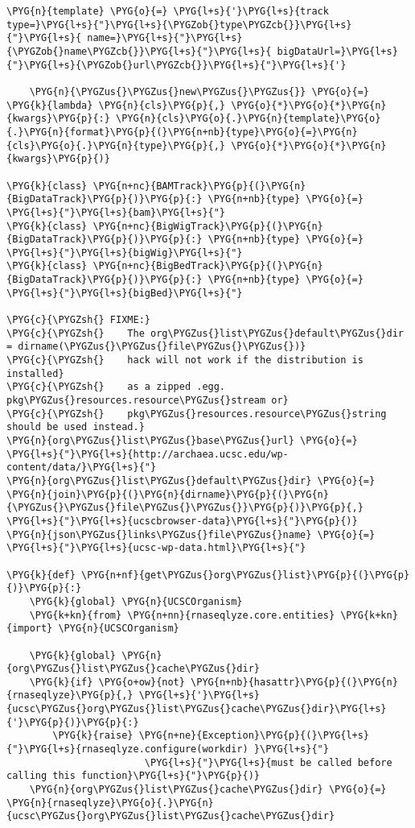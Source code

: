 \begin{Verbatim}[commandchars=\\\{\}]
    \PYG{n}{template} \PYG{o}{=} \PYG{l+s}{'}\PYG{l+s}{track type=}\PYG{l+s}{"}\PYG{l+s}{\PYGZob{}type\PYGZcb{}}\PYG{l+s}{"}\PYG{l+s}{ name=}\PYG{l+s}{"}\PYG{l+s}{\PYGZob{}name\PYGZcb{}}\PYG{l+s}{"}\PYG{l+s}{ bigDataUrl=}\PYG{l+s}{"}\PYG{l+s}{\PYGZob{}url\PYGZcb{}}\PYG{l+s}{"}\PYG{l+s}{'}

    \PYG{n}{\PYGZus{}\PYGZus{}new\PYGZus{}\PYGZus{}} \PYG{o}{=} \PYG{k}{lambda} \PYG{n}{cls}\PYG{p}{,} \PYG{o}{*}\PYG{o}{*}\PYG{n}{kwargs}\PYG{p}{:} \PYG{n}{cls}\PYG{o}{.}\PYG{n}{template}\PYG{o}{.}\PYG{n}{format}\PYG{p}{(}\PYG{n+nb}{type}\PYG{o}{=}\PYG{n}{cls}\PYG{o}{.}\PYG{n}{type}\PYG{p}{,} \PYG{o}{*}\PYG{o}{*}\PYG{n}{kwargs}\PYG{p}{)}

\PYG{k}{class} \PYG{n+nc}{BAMTrack}\PYG{p}{(}\PYG{n}{BigDataTrack}\PYG{p}{)}\PYG{p}{:} \PYG{n+nb}{type} \PYG{o}{=} \PYG{l+s}{"}\PYG{l+s}{bam}\PYG{l+s}{"}
\PYG{k}{class} \PYG{n+nc}{BigWigTrack}\PYG{p}{(}\PYG{n}{BigDataTrack}\PYG{p}{)}\PYG{p}{:} \PYG{n+nb}{type} \PYG{o}{=} \PYG{l+s}{"}\PYG{l+s}{bigWig}\PYG{l+s}{"}
\PYG{k}{class} \PYG{n+nc}{BigBedTrack}\PYG{p}{(}\PYG{n}{BigDataTrack}\PYG{p}{)}\PYG{p}{:} \PYG{n+nb}{type} \PYG{o}{=} \PYG{l+s}{"}\PYG{l+s}{bigBed}\PYG{l+s}{"}

\PYG{c}{\PYGZsh{} FIXME:}
\PYG{c}{\PYGZsh{}    The org\PYGZus{}list\PYGZus{}default\PYGZus{}dir = dirname(\PYGZus{}\PYGZus{}file\PYGZus{}\PYGZus{})}
\PYG{c}{\PYGZsh{}    hack will not work if the distribution is installed}
\PYG{c}{\PYGZsh{}    as a zipped .egg. pkg\PYGZus{}resources.resource\PYGZus{}stream or}
\PYG{c}{\PYGZsh{}    pkg\PYGZus{}resources.resource\PYGZus{}string should be used instead.}
\PYG{n}{org\PYGZus{}list\PYGZus{}base\PYGZus{}url} \PYG{o}{=} \PYG{l+s}{"}\PYG{l+s}{http://archaea.ucsc.edu/wp-content/data/}\PYG{l+s}{"}
\PYG{n}{org\PYGZus{}list\PYGZus{}default\PYGZus{}dir} \PYG{o}{=} \PYG{n}{join}\PYG{p}{(}\PYG{n}{dirname}\PYG{p}{(}\PYG{n}{\PYGZus{}\PYGZus{}file\PYGZus{}\PYGZus{}}\PYG{p}{)}\PYG{p}{,} \PYG{l+s}{"}\PYG{l+s}{ucscbrowser-data}\PYG{l+s}{"}\PYG{p}{)}
\PYG{n}{json\PYGZus{}links\PYGZus{}file\PYGZus{}name} \PYG{o}{=} \PYG{l+s}{"}\PYG{l+s}{ucsc-wp-data.html}\PYG{l+s}{"}

\PYG{k}{def} \PYG{n+nf}{get\PYGZus{}org\PYGZus{}list}\PYG{p}{(}\PYG{p}{)}\PYG{p}{:}
    \PYG{k}{global} \PYG{n}{UCSCOrganism}
    \PYG{k+kn}{from} \PYG{n+nn}{rnaseqlyze.core.entities} \PYG{k+kn}{import} \PYG{n}{UCSCOrganism}

    \PYG{k}{global} \PYG{n}{org\PYGZus{}list\PYGZus{}cache\PYGZus{}dir}
    \PYG{k}{if} \PYG{o+ow}{not} \PYG{n+nb}{hasattr}\PYG{p}{(}\PYG{n}{rnaseqlyze}\PYG{p}{,} \PYG{l+s}{'}\PYG{l+s}{ucsc\PYGZus{}org\PYGZus{}list\PYGZus{}cache\PYGZus{}dir}\PYG{l+s}{'}\PYG{p}{)}\PYG{p}{:}
        \PYG{k}{raise} \PYG{n+ne}{Exception}\PYG{p}{(}\PYG{l+s}{"}\PYG{l+s}{rnaseqlyze.configure(workdir) }\PYG{l+s}{"}
                        \PYG{l+s}{"}\PYG{l+s}{must be called before calling this function}\PYG{l+s}{"}\PYG{p}{)}
    \PYG{n}{org\PYGZus{}list\PYGZus{}cache\PYGZus{}dir} \PYG{o}{=} \PYG{n}{rnaseqlyze}\PYG{o}{.}\PYG{n}{ucsc\PYGZus{}org\PYGZus{}list\PYGZus{}cache\PYGZus{}dir}


\end{Verbatim}
